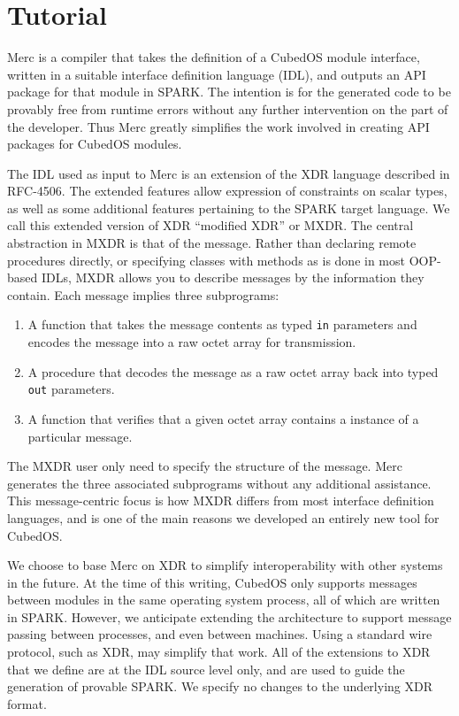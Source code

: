 \chapter{Tutorial}
\label{chapt-tutorial}

Merc is a compiler that takes the definition of a CubedOS module interface, written in a
suitable interface definition language (IDL), and outputs an API package for that module in
SPARK. The intention is for the generated code to be provably free from runtime errors without
any further intervention on the part of the developer. Thus Merc greatly simplifies the work
involved in creating API packages for CubedOS modules.

The IDL used as input to Merc is an extension of the XDR language described in RFC-4506. The
extended features allow expression of constraints on scalar types, as well as some additional
features pertaining to the SPARK target language. We call this extended version of XDR
``modified XDR'' or MXDR. The central abstraction in MXDR is that of the message. Rather than
declaring remote procedures directly, or specifying classes with methods as is done in most
OOP-based IDLs, MXDR allows you to describe messages by the information they contain. Each
message implies three subprograms:

\begin{enumerate}
\item A function that takes the message contents as typed \texttt{in} parameters and encodes the
  message into a raw octet array for transmission.
\item A procedure that decodes the message as a raw octet array back into typed \texttt{out}
  parameters.
\item A function that verifies that a given octet array contains a instance of a particular
  message.
\end{enumerate}

The MXDR user only need to specify the structure of the message. Merc generates the three
associated subprograms without any additional assistance. This message-centric focus is how MXDR
differs from most interface definition languages, and is one of the main reasons we developed an
entirely new tool for CubedOS.

We choose to base Merc on XDR to simplify interoperability with other systems in the future. At
the time of this writing, CubedOS only supports messages between modules in the same operating
system process, all of which are written in SPARK. However, we anticipate extending the
architecture to support message passing between processes, and even between machines. Using a
standard wire protocol, such as XDR, may simplify that work. All of the extensions to XDR that
we define are at the IDL source level only, and are used to guide the generation of provable
SPARK. We specify no changes to the underlying XDR format.

